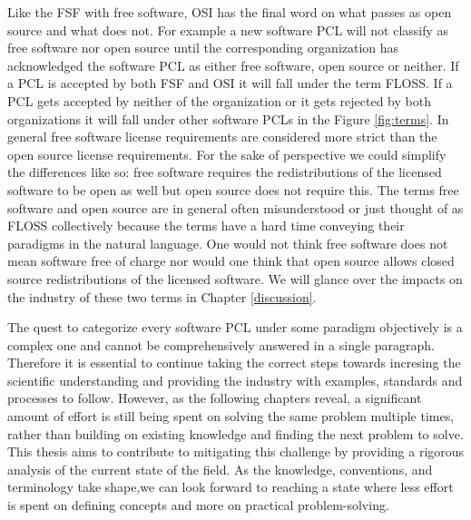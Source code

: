 Like the FSF with free software, OSI has the final word on what passes as open source and what does not. For example a new software PCL will not classify as free software nor open source until the corresponding organization has acknowledged the software PCL as either free software, open source or neither. If a PCL is accepted by both FSF and OSI it will fall under the term FLOSS. If a PCL gets accepted by neither of the organization or it gets rejected by both organizations it will fall under other software PCLs in the Figure \ref{fig:terms}. In general free software license requirements are considered more strict than the open source license requirements. For the sake of perspective we could simplify the differences like so: free software requires the redistributions of the licensed software to be open as well but open source does not require this. The terms free software and open source are in general often misunderstood or just thought of as FLOSS collectively because the terms have a hard time conveying their paradigms in the natural language. One would not think free software does not mean software free of charge nor would one think that open source allows closed source redistributions of the licensed software. We will glance over the impacts on the industry of these two terms in Chapter \ref{discussion}.

The quest to categorize every software PCL under some paradigm objectively is a complex one and cannot be comprehensively answered in a single paragraph. Therefore it is essential to continue taking the correct steps towards incresing the scientific understanding and providing the industry with examples, standards and processes to follow. However, as the following chapters reveal, a significant amount of effort is still being spent on solving the same problem multiple times, rather than building on existing knowledge and finding the next problem to solve. This thesis aims to contribute to mitigating this challenge by providing a rigorous analysis of the current state of the field. As the knowledge, conventions, and terminology take shape,we can look forward to reaching a state where less effort is spent on defining concepts and more on practical problem-solving.